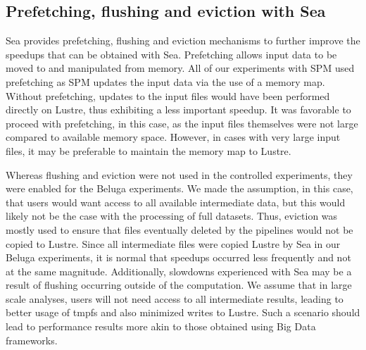     
    \subsection{Prefetching, flushing and eviction with Sea}

    Sea provides prefetching, flushing and eviction mechanisms to further improve
    the speedups that can be obtained with Sea. Prefetching allows input data to be moved
    to and manipulated from memory. All of our experiments with SPM used prefetching as
    SPM updates the input data via the use of a memory map. Without prefetching, updates
    to the input files would have been performed directly on Lustre, thus exhibiting a
    less important speedup. It was favorable to proceed with prefetching, in this case,
    as the input files themselves were not large compared to available memory space. However,
    in cases with very large input files, it may be preferable to maintain the memory map
    to Lustre.

    Whereas flushing and eviction were not used in the controlled experiments,
    they were enabled for the Beluga experiments. We made the assumption, in
    this case, that users would want access to all available intermediate data,
    but this would likely not be the case with the processing of full datasets.
    Thus, eviction was mostly used to ensure that files eventually deleted by the
    pipelines would not be copied to Lustre. Since all intermediate files were
    copied Lustre by Sea in our Beluga experiments, it is normal that speedups
    occurred less frequently and not at the same magnitude. Additionally, slowdowns
    experienced with Sea may be a result of flushing occurring outside of the computation.
    We assume that in large scale analyses, users will not need access to all intermediate
    results, leading to better usage of tmpfs and also minimized writes to Lustre. Such a
    scenario should lead to performance results more akin to those obtained using Big Data
    frameworks.

